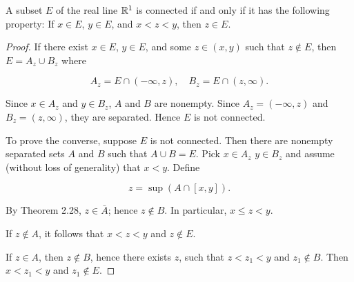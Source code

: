 \begin{thm}
    A subset $E$ of the real line ${\protect\mathbb R}^1$ is connected if and only if it has the following property: If $x \in E$, $y \in E$, and $x < z <y$, then $z \in E$.
\end{thm}

\begin{proof}
If there exist $x \in  E$, $y \in E$, and some $z \in (x, y)$ such that $z \not\in E$, then
$E = A_z \cup B_z$ where

\begin{equation*}
    A_z = E \cap (-\infty, z),\quad
    B_z = E \cap (z, \infty).
\end{equation*}


Since $x \in A_z$ and $y \in B_z$, $A$ and $B$ are nonempty. Since $A_z = (-\infty, z)$ and $B_z = (z, \infty)$, they are separated. Hence $E$ is not connected.

To prove the converse, suppose $E$ is not connected. Then there are
nonempty separated sets $A$ and $B$ such that $A \cup B=E$. Pick $x \in  A_z$ $y \in  B_z$
and assume (without loss of generality) that $x <y$. Define

\begin{equation*}
    z = \sup(A \cap [x, y]).
\end{equation*}

By Theorem 2.28, $z \in \bar{A}$; hence $z \not\in  B$. In particular, $x \leq z <y$.

If $z \not\in A$, it follows that $x < z < y$ and $z \not\in E$.

If $z \in  A$, then $z \not\in B$, hence there exists $z$, such that $z<z_1 <y$ and
$z_1 \not\in  B$. Then $x<z_1 <y$ and $z_1 \not\in  E$.
\end{proof}